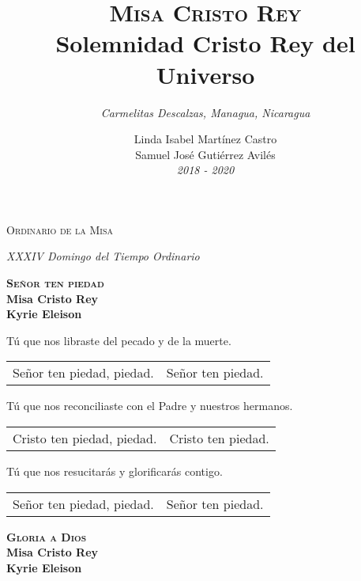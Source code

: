 \documentclass[letterpaper]{report}
\title{ \textbf{ \Huge \scshape Misa Cristo Rey  } \\
{ \LARGE Solemnidad Cristo Rey del Universo } }
\author{ \textit{ \large Carmelitas Descalzas, Managua, Nicaragua } }
\date{ \LARGE Linda Isabel Martínez Castro \\ Samuel José Gutiérrez Avilés \\ \small \textit{2018 - 2020} }
\begin{document}

    \maketitle

    \begin{titlepage}
        \centering
        \vspace*{8cm}
        { \scshape \Huge Ordinario de la Misa \par}
        \vspace{1cm}
        { \itshape \Large XXXIV Domingo del Tiempo Ordinario \par}
        \vfill
    \end{titlepage}
    \newpage

    \begin{center}
        {\scshape \Huge {\bfseries Se\~nor ten piedad}} \\
        {\LARGE {\bfseries Misa Cristo Rey}} \\
        {\Large {\bfseries Kyrie Eleison}}
    \end{center}
    
    \LARGE {T\'u que nos libraste del pecado y de la muerte.}
    
    \LARGE \begin{tabular}{ll}
        Se\~nor ten piedad, piedad.& Se\~nor ten piedad.
    \end{tabular}
    
    \LARGE {T\'u que nos reconciliaste con el Padre y nuestros hermanos.}
    
    \LARGE \begin{tabular}{ll}
        Cristo ten piedad, piedad.& Cristo ten piedad.
    \end{tabular}
    
    \LARGE {T\'u que nos resucitar\'as y glorificar\'as contigo.}
    
    \LARGE \begin{tabular}{ll}
        Se\~nor ten piedad, piedad.& Se\~nor ten piedad.
    \end{tabular}
    
    \clearpage

    \begin{center}
        {\scshape \Huge {\bfseries Gloria a Dios}} \\
        {\LARGE {\bfseries Misa Cristo Rey}} \\
        {\Large {\bfseries Kyrie Eleison}}
    \end{center}
    
\end{document}
